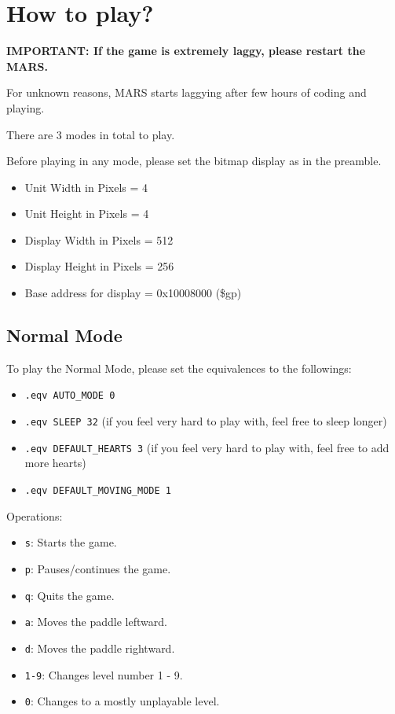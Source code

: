 \documentclass{article}
\newcommand{\code}[1]{\texttt{#1}}
\begin{document}
\newpage

\section{How to play?}

\textbf{IMPORTANT: If the game is extremely laggy, please restart the MARS.}

For unknown reasons, MARS starts laggying after few hours of coding and playing.

There are 3 modes in total to play. 

Before playing in any mode, please set the bitmap display as in the preamble.
\begin{itemize}
    \item Unit Width in Pixels = 4
    \item Unit Height in Pixels = 4
    \item Display Width in Pixels = 512
    \item Display Height in Pixels = 256
    \item Base address for display = 0x10008000 (\$gp)
\end{itemize}

\subsection{Normal Mode}

To play the Normal Mode, please set the equivalences to the followings:

\begin{itemize}
    \item \code{.eqv AUTO\_MODE 0}
    \item \code{.eqv SLEEP 32} (if you feel very hard to play with, feel free to sleep longer)
    \item \code{.eqv DEFAULT\_HEARTS 3} (if you feel very hard to play with, feel free to add more hearts)
    \item \code{.eqv\ DEFAULT\_MOVING\_MODE\ 1}
\end{itemize}

Operations:
\begin{itemize}
    \item \code{s}: Starts the game.
    \item \code{p}: Pauses/continues the game.
    \item \code{q}: Quits the game.
    \item \code{a}: Moves the paddle leftward.
    \item \code{d}: Moves the paddle rightward.
    \item \code{1-9}: Changes level number 1 - 9.
    \item \code{0}: Changes to a mostly unplayable level.
\end{itemize}
\end{document}
